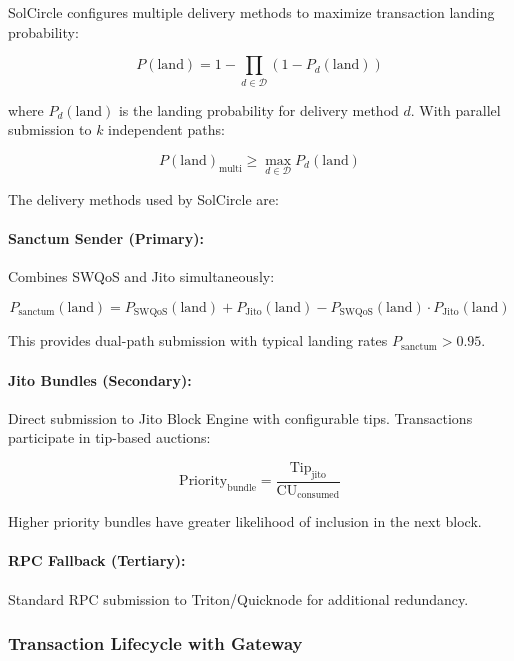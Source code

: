 \documentclass[11pt,a4paper]{article}
\begin{document}
SolCircle configures multiple delivery methods to maximize transaction landing probability:

\begin{equation}
P(\text{land}) = 1 - \prod_{d \in \mathcal{D}} (1 - P_d(\text{land}))
\end{equation}

where $P_d(\text{land})$ is the landing probability for delivery method $d$. With parallel submission to $k$ independent paths:

\begin{equation}
P(\text{land})_{\text{multi}} \geq \max_{d \in \mathcal{D}} P_d(\text{land})
\end{equation}

The delivery methods used by SolCircle are:

\paragraph{Sanctum Sender (Primary):} Combines SWQoS and Jito simultaneously:

\begin{equation}
P_{\text{sanctum}}(\text{land}) = P_{\text{SWQoS}}(\text{land}) + P_{\text{Jito}}(\text{land}) - P_{\text{SWQoS}}(\text{land}) \cdot P_{\text{Jito}}(\text{land})
\end{equation}

This provides dual-path submission with typical landing rates $P_{\text{sanctum}} > 0.95$.

\paragraph{Jito Bundles (Secondary):} Direct submission to Jito Block Engine with configurable tips. Transactions participate in tip-based auctions:

\begin{equation}
\text{Priority}_{\text{bundle}} = \frac{\text{Tip}_{\text{jito}}}{\text{CU}_{\text{consumed}}}
\end{equation}

Higher priority bundles have greater likelihood of inclusion in the next block.

\paragraph{RPC Fallback (Tertiary):} Standard RPC submission to Triton/Quicknode for additional redundancy.

\subsubsection{Transaction Lifecycle with Gateway}
\end{document}
